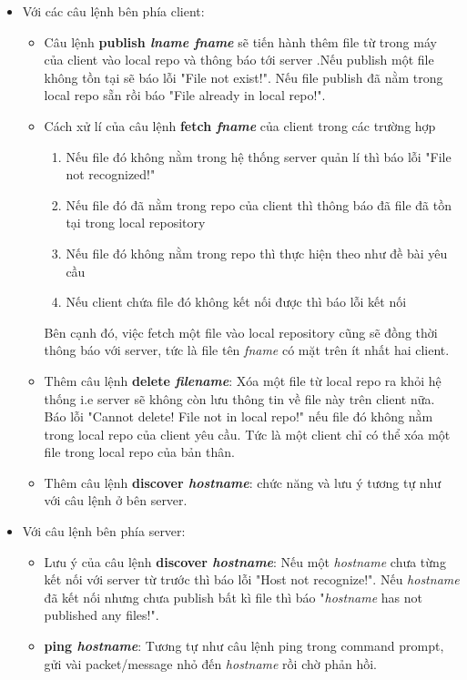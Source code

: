 \documentclass[a4paper]{article}
\begin{document}
	\begin{itemize}
		\item Với các câu lệnh bên phía client:
		\begin{itemize}
			\item Câu lệnh \textbf{publish \textit{lname fname}} sẽ tiến hành thêm file từ trong máy của client vào local repo và thông báo tới server .Nếu publish một file không tồn tại sẽ báo lỗi "File not exist!". Nếu file publish đã nằm trong local repo sẵn rồi báo "File already in local repo!".
			\item Cách xử lí của câu lệnh \textbf{fetch \textit{fname}} của client trong các trường hợp
			\begin{enumerate}
				\item Nếu file đó không nằm trong hệ thống server quản lí thì báo lỗi "File not recognized!"
				\item Nếu file đó đã nằm trong repo của client thì thông báo đã file đã tồn tại trong local repository
				\item Nếu file đó không nằm trong repo thì thực hiện theo như đề bài yêu cầu
				\item Nếu client chứa file đó không kết nối được thì báo lỗi kết nối 
			\end{enumerate}
			Bên cạnh đó, việc fetch một file vào local repository cũng sẽ đồng thời thông báo với server, tức là file tên \textit{fname} có mặt trên ít nhất hai client.
			\item Thêm câu lệnh \textbf{delete \textit{filename}}: Xóa một file từ local repo ra khỏi hệ thống i.e server sẽ không còn lưu thông tin về file này trên client nữa.
			Báo lỗi "Cannot delete! File not in local repo!" nếu file đó không nằm trong local repo của client yêu cầu. Tức là một client chỉ có thể xóa một file trong local repo của bản thân.
			\item Thêm câu lệnh \textbf{discover \textit{hostname}}: chức năng và lưu ý tương tự như với câu lệnh ở bên server.
		\end{itemize}
		\item Với câu lệnh bên phía server:
		\begin{itemize}
			\item Lưu ý của câu lệnh \textbf{discover \textit{hostname}}: Nếu một \textit{hostname} chưa từng kết nối với server từ trước thì báo lỗi "Host not recognize!". Nếu \textit{hostname} đã kết nối nhưng chưa publish bất kì file thì báo "\textit{hostname} has not published any files!".
			\item \textbf{ping \textit{hostname}}: Tương tự như câu lệnh ping trong command prompt, gửi vài packet/message nhỏ đến \textit{hostname} rồi chờ phản hồi.

\end{itemize}
\end{itemize}
\end{document}
